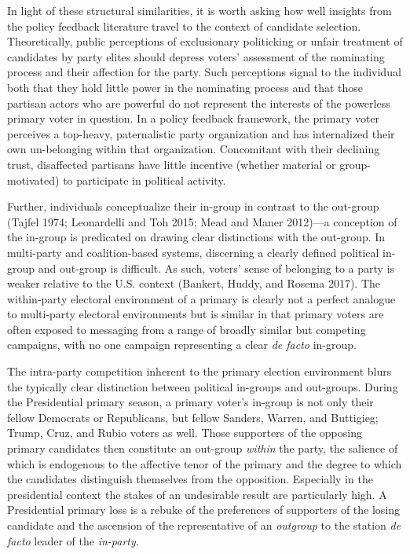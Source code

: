 \documentclass[
]{article}
\begin{document}
In light of these structural similarities, it is worth asking how well insights from the policy feedback literature travel to the context of candidate selection. Theoretically, public perceptions of exclusionary politicking or unfair treatment of candidates by party elites should depress voters' assessment of the nominating process and their affection for the party. Such perceptions signal to the individual both that they hold little power in the nominating process and that those partisan actors who are powerful do not represent the interests of the powerless primary voter in question. In a policy feedback framework, the primary voter perceives a top-heavy, paternalistic party organization and has internalized their own un-belonging within that organization. Concomitant with their declining trust, disaffected partisans have little incentive (whether material or group-motivated) to participate in political activity.

Further, individuals conceptualize their in-group in contrast to the out-group (Tajfel 1974; Leonardelli and Toh 2015; Mead and Maner 2012)---a conception of the in-group is predicated on drawing clear distinctions with the out-group. In multi-party and coalition-based systems, discerning a clearly defined political in-group and out-group is difficult. As such, voters' sense of belonging to a party is weaker relative to the U.S. context (Bankert, Huddy, and Rosema 2017). The within-party electoral environment of a primary is clearly not a perfect analogue to multi-party electoral environments but is similar in that primary voters are often exposed to messaging from a range of broadly similar but competing campaigns, with no one campaign representing a clear \emph{de facto} in-group.

The intra-party competition inherent to the primary election environment blurs the typically clear distinction between political in-groups and out-groups. During the Presidential primary season, a primary voter's in-group is not only their fellow Democrats or Republicans, but fellow Sanders, Warren, and Buttigieg; Trump, Cruz, and Rubio voters as well. Those supporters of the opposing primary candidates then constitute an out-group \emph{within} the party, the salience of which is endogenous to the affective tenor of the primary and the degree to which the candidates distinguish themselves from the opposition. Especially in the presidential context the stakes of an undesirable result are particularly high. A Presidential primary loss is a rebuke of the preferences of supporters of the losing candidate and the ascension of the representative of an \emph{outgroup} to the station \emph{de facto} leader of the \emph{in-party}.
\end{document}
